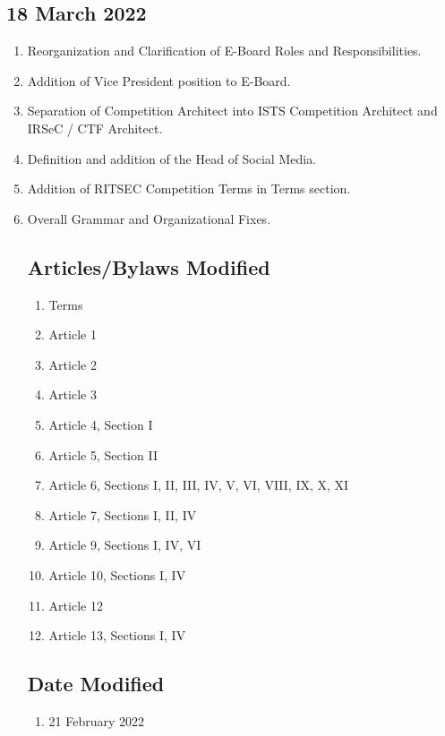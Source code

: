 \subsection{18 March 2022}
\begin{enumerate}
      \item Reorganization and Clarification of E-Board Roles and Responsibilities.
      \item Addition of Vice President position to E-Board.
      \item Separation of Competition Architect into ISTS Competition Architect and IRSeC /
            CTF Architect.
      \item Definition and addition of the Head of Social Media.
      \item Addition of RITSEC Competition Terms in Terms section.
      \item Overall Grammar and Organizational Fixes.

            \subsection{Articles/Bylaws Modified}
            \begin{enumerate}
                  \item Terms
                  \item Article 1
                  \item Article 2
                  \item Article 3
                  \item Article 4, Section I
                  \item Article 5, Section II
                  \item Article 6, Sections I, II, III, IV, V, VI, VIII, IX, X, XI
                  \item Article 7, Sections I, II, IV
                  \item Article 9, Sections I, IV, VI
                  \item Article 10, Sections I, IV
                  \item Article 12
                  \item Article 13, Sections I, IV
            \end{enumerate}

            \subsection{Date Modified}
            \begin{enumerate}
                  \item 21 February 2022
            \end{enumerate}


\end{enumerate}
